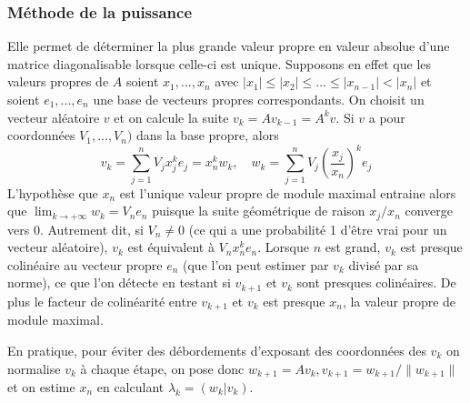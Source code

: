 \documentclass[a4paper,11pt]{article}
\begin{document}
\begin{giacjshere}
\subsubsection{Méthode de la puissance} 
Elle permet de déterminer la plus grande valeur propre en valeur absolue
d'une matrice diagonalisable lorsque celle-ci est unique.
Supposons en effet que les valeurs propres de $A$ soient
$x_1,...,x_n$ avec $|x_1| \leq |x_2| \leq ... \leq |x_{n-1}| < |x_n|$
et soient $e_1,...,e_n$ une base de vecteurs propres correspondants.
On choisit un vecteur aléatoire $v$ et on calcule la suite
$v_k=Av_{k-1}=A^k v $. Si $v$ a pour coordonnées $V_1,...,V_n)$ 
dans la base propre, alors
\[ v_k = \sum_{j=1}^n V_j x_j^k e_j 
= x_n^k w_k, \quad w_k=\sum_{j=1}^n V_j \left(\frac{x_j}{x_n}\right)^k e_j
\]
L'hypothèse que $x_n$ est l'unique valeur propre
de module maximal entraine alors 
que $\lim_{k \rightarrow +\infty} w_k = V_n e_n$ puisque la suite
géométrique de raison $x_j/x_n$ converge vers 0.
Autrement dit, si $V_n\neq 0$ (ce qui a une probabilité 1 d'être
vrai pour un vecteur aléatoire), 
$v_k$ est équivalent à $V_n x_n^k e_n$. Lorsque $n$
est grand, $v_k$ est presque colinéaire au vecteur propre
$e_n$ (que l'on peut estimer par $v_k$ divisé par sa norme), 
ce que l'on détecte en testant si $v_{k+1}$ et $v_k$
sont presques colinéaires. De plus le facteur de colinéarité
entre $v_{k+1}$ et $v_k$ est presque $x_n$, la valeur propre
de module maximal.

En pratique, pour \'eviter des d\'ebordements d'exposant des
coordonn\'ees des $v_k$ on normalise $v_k$ \`a chaque
\'etape, on pose donc $w_{k+1}=Av_k, v_{k+1}=w_{k+1}/\|w_{k+1}\|$ 
et on estime $x_n$ en calculant $\lambda_k=(w_k|v_k)$.


\end{giacjshere}
\end{document}
